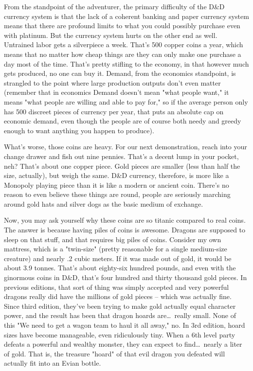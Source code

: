 From the standpoint of the adventurer, the primary difficulty of the D\&D currency system is that the lack of a coherent banking and paper currency system means that there are profound limits to what you could possibly purchase even with platinum. But the currency system hurts on the other end as well. Untrained labor gets a silverpiece a week. That's 500 copper coins a year, which means that no matter how cheap things are they can only make one purchase a day most of the time. That's pretty stifling to the economy, in that however much gets produced, no one can buy it. Demand, from the economics standpoint, is strangled to the point where large production outputs don't even matter (remember that in economics Demand doesn't mean "what people want," it means "what people are willing and able to pay for," so if the average person only has 500 discreet pieces of currency per year, that puts an absolute cap on economic demand, even though the people are of course both needy and greedy enough to want anything you happen to produce).

What's worse, those coins are heavy. For our next demonstration, reach into your change drawer and fish out nine pennies. That's a decent lump in your pocket, neh? That's about one copper piece. Gold pieces are smaller (less than half the size, actually), but weigh the same. D\&D currency, therefore, is more like a Monopoly playing piece than it is like a modern or ancient coin. There's no reason to even believe these things are round, people are seriously marching around gold hats and silver dogs as the basic medium of exchange.

Now, you may ask yourself why these coins are so titanic compared to real coins. The answer is because having piles of coins is awesome. Dragons are supposed to sleep on that stuff, and that requires big piles of coins. Consider my own mattress, which is a "twin-size" (pretty reasonable for a single medium-size creature) and nearly .2 cubic meters. If it was made out of gold, it would be about 3.9 tonnes. That's about eighty-six hundred pounds, and even with the ginormous coins in D\&D, that's four hundred and thirty thousand gold pieces. In previous editions, that sort of thing was simply accepted and very powerful dragons really did have the millions of gold pieces -- which was actually fine. Since third edition, they've been trying to make gold actually equal character power, and the result has been that dragon hoards are\ldots\  really small. None of this "We need to get a wagon team to haul it all away," no. In 3rd edition, hoard sizes have become manageable, even ridiculously tiny. When a 6th level party defeats a powerful and wealthy monster, they can expect to find\ldots\  nearly a liter of gold. That is, the treasure "hoard" of that evil dragon you defeated will actually fit into an Evian bottle.

